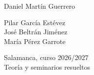 \documentclass[11pt,twoside]{article}
\begin{document}
\begin{titlepage}
\begin{minipage}[t]{0.32\textwidth}
{\small Daniel Martín Guerrero}
\end{minipage}\hfill
\begin{minipage}[t]{0.32\textwidth}\centering
{\color{acc}\footnotesize{}}\par\vspace{2pt}
{\small Pilar García Estévez\\ José Beltrán Jiménez\\ María Pérez Garrote}
\end{minipage}\hfill
\begin{minipage}[t]{0.32\textwidth}\raggedleft
{\color{acc}\footnotesize{}}\par\vspace{2pt}
{\small Salamanca, curso 2026/2027}\\[1pt]
{\footnotesize\color{muted}Teoría y seminarios resueltos}
\end{minipage}
\end{titlepage}

\setcounter{page}{2}
{\hypersetup{linkcolor=fg}\tableofcontents}
\clearpage


\end{document}
